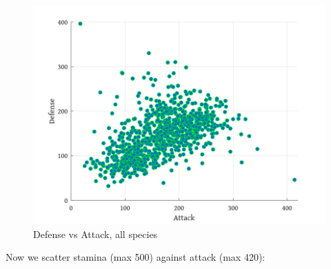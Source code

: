 \begin{figure}[h]
\centering
\includegraphics[width=\textwidth,keepaspectratio]{graph/AllDvA.png}
\caption{Defense vs Attack, all species}
\label{figure:alldva}
\end{figure}

Now we scatter stamina (max 500) against attack (max 420):

